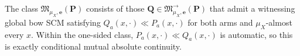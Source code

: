 The class \(\mathfrak M_{\mu_X,\boldsymbol e}(\boldsymbol P)\) consists of those \(\boldsymbol Q\in\mathfrak M^{\to}_{\mu_X,\boldsymbol e}(\boldsymbol P)\) that admit a witnessing global bow SCM satisfying \(Q_a(x,\cdot)\ll P_a(x,\cdot)\) for both arms and \(\mu_X\)-almost every \(x\).  Within the one-sided class, \(P_a(x,\cdot)\ll Q_a(x,\cdot)\) is automatic, so this is exactly conditional mutual absolute continuity.